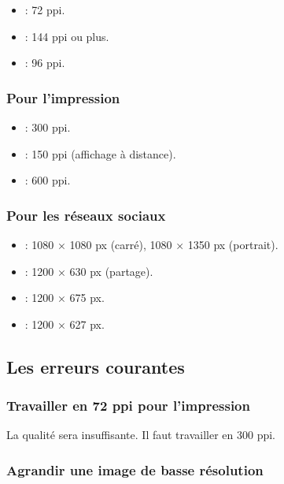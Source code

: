 \begin{itemize}
    \item {} : 72 ppi.
    \item {} : 144 ppi ou plus.
    \item {} : 96 ppi.
\end{itemize}

\subsubsection{Pour l'impression}

\begin{itemize}
    \item {} : 300 ppi.
    \item {} : 150 ppi (affichage à distance).
    \item {} : 600 ppi.
\end{itemize}

\subsubsection{Pour les réseaux sociaux}

\begin{itemize}
    \item {} : 1080 × 1080 px (carré), 1080 × 1350 px (portrait).
    \item {} : 1200 × 630 px (partage).
    \item {} : 1200 × 675 px.
    \item {} : 1200 × 627 px.
\end{itemize}

\subsection{Les erreurs courantes}

\subsubsection{Travailler en 72 ppi pour l'impression}

La qualité sera insuffisante. Il faut travailler en 300 ppi.

\subsubsection{Agrandir une image de basse résolution}


